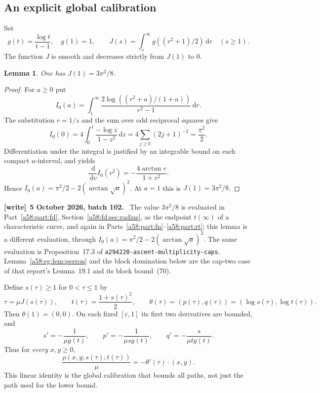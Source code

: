 \documentclass[11pt,letterpaper]{article}
\newcommand{\file}[1]{\nolinkurl{#1}}
\newtheorem{lemma}[theorem]{Lemma}
\theoremstyle{remark}
\newcommand{\egdd}{\,\mathrm d}
\newcommand{\muval}{\mu}
\newenvironment{writenote}[1][]{\par\smallskip\begingroup\small
 \noindent\textbf{[write]}\if\relax\detokenize{#1}\relax\else~\textbf{#1.}\fi\ }%
 {\par\endgroup\smallskip}
\begin{document}
\subsection{An explicit global calibration}
Set
\begin{equation}\label{a58:eg:eq:gJ}
 g(t)=\frac{\log t}{t-1},\quad g(1)=1,
 \qquad J(s)=\int_s^\infty g((r^2+1)/2)\egdd r\quad(s\ge1).
\end{equation}
The function $J$ is smooth and decreases strictly from $J(1)$ to 0.
\begin{lemma}\label{a58:eg:lem:action}
One has $J(1)=3\pi^2/8$.
\end{lemma}
\begin{proof}
For $a\ge0$ put
\[
 I_0(a)=\int_1^\infty
 \frac{2\log((r^2+a)/(1+a))}{r^2-1}\egdd r.
\]
The substitution $r=1/z$ and the sum over odd reciprocal squares give
\[
 I_0(0)=4\int_0^1\frac{-\log z}{1-z^2}\egdd z
 =4\sum_{j\ge0}(2j+1)^{-2}=\frac{\pi^2}{2}.
\]
Differentiation under the integral is justified by an integrable bound on each compact $a$-interval, and yields
\[
 \frac{\egdd}{\egdd v}I_0(v^2)
 =-\frac{4\arctan v}{1+v^2}.
\]
Hence $I_0(a)=\pi^2/2-2(\arctan\sqrt a)^2$. At $a=1$ this is $J(1)=3\pi^2/8$.
\end{proof}

\begin{writenote}[5 October 2026, batch 102]
The value $3\pi^2/8$ is evaluated in Part~\ref{a58:part:fd}, Section~\ref{a58:fd:sec:radius}, as the endpoint $t(\infty)$ of a characteristic curve, and again in Parts~\ref{a58:part:fn}--\ref{a58:part:rt}; this lemma is a different evaluation, through $I_0(a)=\pi^2/2-2(\arctan\sqrt a)^2$. The same evaluation is Proposition~17.3 of \file{a294220-ascent-multiplicity-caps}. Lemma~\ref{a58:eg:lem:perron} and the block domination below are the cap-two case of that report's Lemma~19.1 and its block bound~(70).
\end{writenote}

Define $s(\tau)\ge1$ for $0<\tau\le1$ by
\begin{equation}\label{a58:eg:eq:calibration}
 \tau=\muval J(s(\tau)),\qquad
 t(\tau)=\frac{1+s(\tau)^2}{2},\qquad
 \theta(\tau)=(p(\tau),q(\tau))=(\log s(\tau),\log t(\tau)).
\end{equation}
Then $\theta(1)=(0,0)$. On each fixed $[\varepsilon,1]$ its first two derivatives are bounded, and
\begin{equation}\label{a58:eg:eq:thetaderiv}
 s'=-\frac1{\muval g(t)},\qquad
 p'=-\frac1{\muval s g(t)},\qquad
 q'=-\frac{s}{\muval t g(t)}.
\end{equation}
Thus for \emph{every} $x,y\ge0$,
\begin{equation}\label{a58:eg:eq:globalcal}
 \frac{\rho(x,y;s(\tau),t(\tau))}{\muval}
 =-\theta'(\tau)\cdot(x,y).
\end{equation}
This linear identity is the global calibration that bounds all paths, not just the path used for the lower bound.
\end{document}
